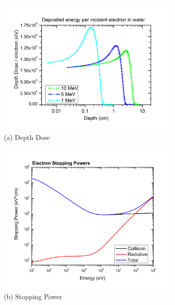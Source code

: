 \documentclass[11pt]{article} %
\begin{document}
	 
	\begin{figure}[ht] \label{fig:ewater}
	\centering
		\begin{subfigure}[h]{0.5\textwidth}
			\includegraphics[width=\textwidth]{PENE_DepthDose.png}
			\caption{(a) Depth Dose}
		\end{subfigure}
		\begin{subfigure}[h]{0.5\textwidth}
			\includegraphics[width=\textwidth]{elec_stp.png}
			\caption{(b) Stopping Power}
		\end{subfigure}
		\begin{subfigure}[h]{0.5\textwidth}

\end{subfigure}
\end{figure}
\end{document}
